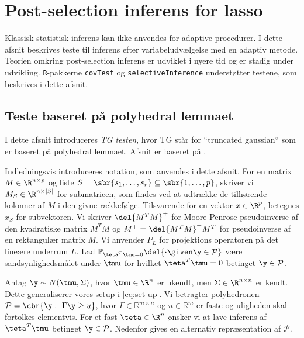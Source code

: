 \section{Post-selection inferens for lasso}
Klassisk statistisk inferens kan ikke anvendes for adaptive procedurer.
I dette afsnit beskrives teste til inferens efter variabeludvælgelse med en adaptiv metode.
Teorien omkring post-selection inferens er udviklet i nyere tid og er stadig under udvikling.
\texttt{R}-pakkerne \texttt{covTest} og \texttt{selectiveInference} understøtter testene, som beskrives i dette afsnit.



\subsection{Teste baseret på polyhedral lemmaet}
I dette afsnit introduceres \textit{TG testen}, hvor TG står for ``truncated gaussian`` som er baseret på polyhedral lemmaet. 
Afsnit er baseret på \citep{post_inference}.

Indledningsvis introduceres notation, som anvendes i dette afsnit.
For en matrix \(M \in \R^{n \times p}\) og liste \(S = \sbr{s_1, \ldots, s_r} \subseteq \sbr{1, \ldots, p}\), skriver vi \(M_S \in \R^{n \times \vert S \vert}\) for submatricen, som findes ved at udtrække de tilhørende kolonner af \(M\) i den givne rækkefølge.
Tilsvarende for en vektor \(x \in \R^p\), betegnes \(x_S\) for subvektoren.
Vi skriver \(\del{M^T M}^+\) for Moore Penrose pseudoinverse af den kvadratiske matrix \(M^T M\) og \(M^+ = \del{M^T M}^+ M^T\) for pseudoinverse af en rektangulær matrix \(M\).
Vi anvender \(P_L\) for projektions operatoren på det lineære underrum \(L\).
Lad \(\mathbb{P}_{\teta^T \tmu = 0} \del{\cdot \given \y \in \mathcal{P}} \) være sandsynlighedsmålet under \(\tmu\) for hvilket \(\teta^T \tmu =0 \) betinget \(\y \in \mathcal{P}\). 

Antag \(\y \sim N(\tmu, \Sigma)\), hvor \(\tmu \in \R^{n}\) er ukendt, men \(\Sigma \in \R^{n \times n}\) er kendt.
Dette generaliserer vores setup i \eqref{eq:set-up}.
Vi betragter polyhedronen \(\mathcal{P} = \cbr{\y : \ \Gamma \y \geq u}\), hvor \(\Gamma \in \mathbb{R}^{m \times n}\) og \(u \in \mathbb{R}^m\) er faste og uligheden skal fortolkes elementvis.
For et fast \(\teta \in \R^n\) ønsker vi at lave inferens af \(\teta^T \tmu\) betinget \(\y \in \mathcal{P}\).
Nedenfor gives en alternativ repræsentation af \(\mathcal{P}\).



